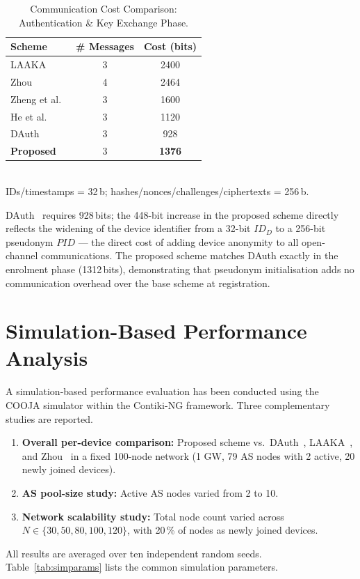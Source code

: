 \documentclass[12pt,a4paper]{report}
\begin{document}
\begin{table}[!ht]
  \centering
  \caption{Communication Cost Comparison: Authentication \& Key Exchange Phase.}
  \label{tab:comm_auth}
  \small
  \setlength{\tabcolsep}{6pt}
  \begin{tabular}{lcc}
    \toprule
    Scheme & \# Messages & Cost (bits) \\
    \midrule
    LAAKA~\cite{ali2024laaka}          & 3 & 2400 \\
    Zhou~\cite{zhou2024auth}           & 4 & 2464 \\
    Zheng et al.~\cite{zheng2022puf}   & 3 & 1600 \\
    He et al.~\cite{he2023lightweight} & 3 & 1120 \\
    DAuth~\cite{das2026comsnets}        & 3 & 928 \\
    \textbf{Proposed}                  & 3 & \textbf{1376} \\
    \bottomrule
  \end{tabular}\\[4pt]
  \small IDs/timestamps = 32\,b; hashes/nonces/challenges/ciphertexts = 256\,b.
\end{table}

DAuth~\cite{das2026comsnets} requires 928\,bits; the 448-bit increase in the proposed
scheme directly reflects the widening of the device identifier from a 32-bit $ID_D$
to a 256-bit pseudonym $\mathit{PID}$ — the direct cost of adding device anonymity
to all open-channel communications.
The proposed scheme matches DAuth exactly in the enrolment phase (1312\,bits),
demonstrating that pseudonym initialisation adds no communication overhead over the
base scheme at registration.

\FloatBarrier
\section{Simulation-Based Performance Analysis}
\label{sec:sim}

A simulation-based performance evaluation has been conducted using the COOJA
simulator within the Contiki-NG framework.
Three complementary studies are reported.
\begin{enumerate}
  \item \textbf{Overall per-device comparison:} Proposed scheme vs.\
    DAuth~\cite{das2026comsnets}, LAAKA~\cite{ali2024laaka}, and Zhou~\cite{zhou2024auth}
    in a fixed 100-node network (1 GW, 79 AS nodes with 2 active, 20 newly joined devices).
  \item \textbf{AS pool-size study:} Active AS nodes varied from 2 to 10.
  \item \textbf{Network scalability study:} Total node count varied across
    $N \in \{30, 50, 80, 100, 120\}$, with 20\,\% of nodes as newly joined devices.
\end{enumerate}
All results are averaged over ten independent random seeds.
Table~\ref{tab:simparams} lists the common simulation parameters.
\end{document}
